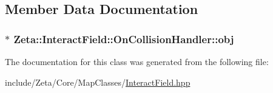 \subsection{Member Data Documentation}
\hypertarget{classZeta_1_1InteractField_1_1OnCollisionHandler_ad270268daee27622af25a41137817fc2}{
\subsubsection[{obj}]{$\ast$ Zeta\+::\+Interact\+Field\+::\+On\+Collision\+Handler\+::obj\hspace{0.3cm}{\ttfamily [private]}}}\label{classZeta_1_1InteractField_1_1OnCollisionHandler_ad270268daee27622af25a41137817fc2}


The documentation for this class was generated from the following file\+:\begin{DoxyCompactItemize}
\item 
include/\+Zeta/\+Core/\+Map\+Classes/\hyperlink{InteractField_8hpp}{Interact\+Field.\+hpp}\end{DoxyCompactItemize}
